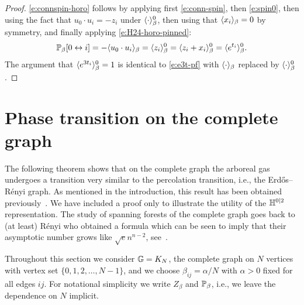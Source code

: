 \documentclass[11pt]{amsart}
\numberwithin{equation}{section}
\numberwithin{theorem}{section}
\begin{document}
\begin{proof}
  \eqref{e:connspin-horo} follows by applying first
  \eqref{e:conn-spin}, then \eqref{e:spin0}, then using the fact that
  $u_0\cdot u_i=-z_i$ under $\avg{\cdot}_\beta^0$, then using
  that $\avg{x_i}_\beta=0$ by symmetry, and finally applying
  \eqref{e:H24-horo-pinned}:
  \begin{equation}
    \P_\beta[0\leftrightarrow i] = -\avg{u_0\cdot u_i}_\beta
    = \avg{z_i}_\beta^0
    = \avg{z_i+x_i}_\beta^0
    = \avg{e^{t_i}}_\beta^0.
  \end{equation}
  The argument that $\avg{e^{3t_{i}}}_{\beta}^{0}=1$
  is identical to     \eqref{e:e3t-pf} with $\avg{\cdot}_\beta$ replaced by $\avg{\cdot}_\beta^0$.
\end{proof}



\section{Phase transition on the complete graph}
\label{sec:MFT}

The following theorem shows that on the complete graph the arboreal
gas undergoes a transition very similar to the percolation transition,
i.e., the Erd\H{o}s--R\'enyi graph. As mentioned in the
introduction, this result has been obtained
previously~\cite{MR1167294,MR3845513,MR2567041}. We have included
a proof only to illustrate the utility of the $\HH^{0|2}$ representation.
The study of spanning forests of the complete graph goes back to (at least)
R\'{e}nyi \cite{MR0115938} who obtained a formula which can be seen to
imply that their asymptotic number grows like $\sqrt{e}n^{n-2}$,
see~\cite{MR0274333}.  

Throughout this section we consider $\bbG = K_{N}$, the
complete graph on $N$ vertices
 with vertex set $\{0,1,2,\dots, N-1\}$, and we choose
$\beta_{ij} = \alpha/N$ with $\alpha>0$ fixed for all edges
$ij$. For notational simplicity we write $Z_{\beta}$ and
$\P_{\beta}$, i.e., we leave the dependence on $N$ implicit.
\end{document}
